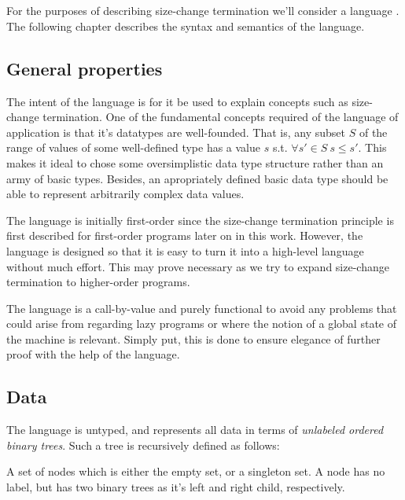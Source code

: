 \chapter{}

For the purposes of describing size-change termination we'll consider a language
. The following chapter describes the syntax and semantics of the
language.

\section{General properties}

The intent of the language is for it be used to explain concepts such as
size-change termination. One of the fundamental concepts required of the
language of application is that it's datatypes are well-founded. That is, any
subset $S$ of the range of values of some well-defined type has a value $s$
s.t. $\forall {s'\in S}\ s\leq s'$. This makes it ideal to chose some
oversimplistic data type structure rather than an army of basic types. Besides,
an apropriately defined basic data type should be able to represent arbitrarily
complex data values.

The language is initially first-order since the size-change termination
principle is first described for first-order programs later on in this work.
However, the language is designed so that it is easy to turn it into a
high-level language without much effort. This may prove necessary as we try to
expand size-change termination to higher-order programs.

The language is a call-by-value and purely functional to avoid any problems
that could arise from regarding lazy programs or where the notion of a global
state of the machine is relevant. Simply put, this is done to ensure elegance
of further proof with the help of the language.

\section{Data}

The language  is untyped, and represents all data in terms of
\emph{unlabeled ordered binary trees}. Such a tree is recursively defined as
follows:

\begin{definition}

A set of nodes which is either the empty set, or a singleton set. A node has no
label, but has two binary trees as it's left and right child, respectively.

\end{definition}

